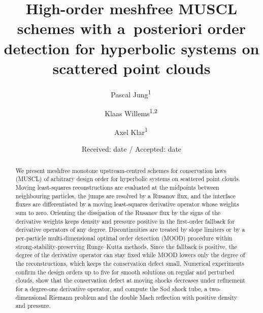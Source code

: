 \documentclass[smallextended]{svjour3}
\numberwithin{equation}{section}
\begin{document}
\title{High-order meshfree MUSCL schemes with a~posteriori order detection for hyperbolic systems on scattered point clouds}

\author{Pascal Jung\textsuperscript{1}\, \and
  Klaas Willems\textsuperscript{1,2}\, \and
  Axel Klar\textsuperscript{1}\,}


\date{Received: date / Accepted: date}

\maketitle

\begin{abstract}
We present meshfree monotone upstream-centred schemes for conservation laws (MUSCL) of arbitrary design order for hyperbolic systems on scattered point clouds. Moving least-squares reconstructions are evaluated at the midpoints between neighbouring particles, the jumps are resolved by a Rusanov flux, and the interface fluxes are differentiated by a moving least-squares derivative operator whose weights sum to zero. Orienting the dissipation of the Rusanov flux by the signs of the derivative weights keeps density and pressure positive in the first-order fallback for derivative operators of any degree. Discontinuities are treated by slope limiters or by a per-particle multi-dimensional optimal order detection (MOOD) procedure within strong-stability-preserving Runge--Kutta methods. Since the fallback is positive, the degree of the derivative operator can stay fixed while MOOD lowers only the degree of the reconstructions, which keeps the conservation defect small. Numerical experiments confirm the design orders up to five for smooth solutions on regular and perturbed clouds, show that the conservation defect at moving shocks decreases under refinement for a degree-one derivative operator, and compute the Sod shock tube, a two-dimensional Riemann problem and the double Mach reflection with positive density and pressure.
\end{abstract}
\end{document}
